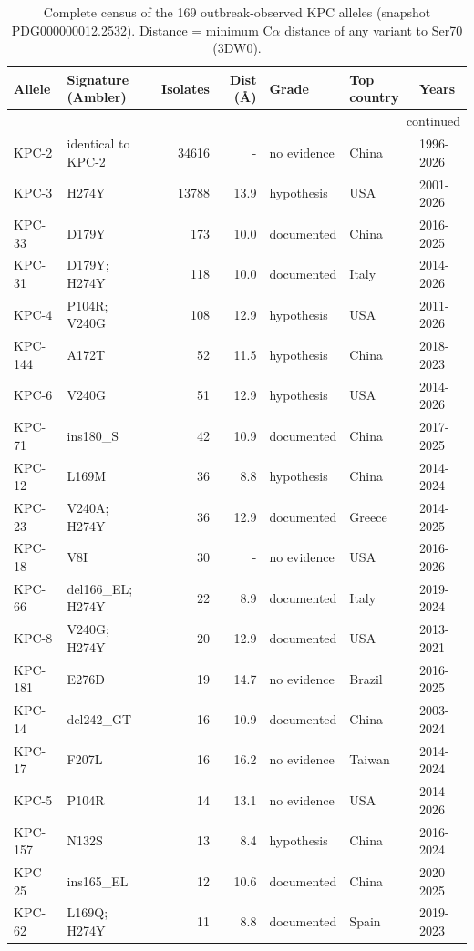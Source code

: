 \footnotesize\begin{longtable}{@{}l p{4.6cm} r r l l l@{}}
\caption{Complete census of the 169 outbreak-observed KPC alleles (snapshot PDG000000012.2532). Distance = minimum C$\alpha$ distance of any variant to Ser70 (3DW0).}\\
\hline Allele & Signature (Ambler) & Isolates & Dist (\AA) & Grade & Top country & Years \\\hline\endhead
\hline\multicolumn{7}{r}{continued}\\\endfoot
\hline\endlastfoot
KPC-2 & identical to KPC-2 & 34616 & - & no evidence & China & 1996-2026 \\
KPC-3 & H274Y & 13788 & 13.9 & hypothesis & USA & 2001-2026 \\
KPC-33 & D179Y & 173 & 10.0 & documented & China & 2016-2025 \\
KPC-31 & D179Y; H274Y & 118 & 10.0 & documented & Italy & 2014-2026 \\
KPC-4 & P104R; V240G & 108 & 12.9 & hypothesis & USA & 2011-2026 \\
KPC-144 & A172T & 52 & 11.5 & hypothesis & China & 2018-2023 \\
KPC-6 & V240G & 51 & 12.9 & hypothesis & USA & 2014-2026 \\
KPC-71 & ins180\_S & 42 & 10.9 & documented & China & 2017-2025 \\
KPC-12 & L169M & 36 & 8.8 & hypothesis & China & 2014-2024 \\
KPC-23 & V240A; H274Y & 36 & 12.9 & documented & Greece & 2014-2025 \\
KPC-18 & V8I & 30 & - & no evidence & USA & 2016-2026 \\
KPC-66 & del166\_EL; H274Y & 22 & 8.9 & documented & Italy & 2019-2024 \\
KPC-8 & V240G; H274Y & 20 & 12.9 & documented & USA & 2013-2021 \\
KPC-181 & E276D & 19 & 14.7 & no evidence & Brazil & 2016-2025 \\
KPC-14 & del242\_GT & 16 & 10.9 & documented & China & 2003-2024 \\
KPC-17 & F207L & 16 & 16.2 & no evidence & Taiwan & 2014-2024 \\
KPC-5 & P104R & 14 & 13.1 & no evidence & USA & 2014-2026 \\
KPC-157 & N132S & 13 & 8.4 & hypothesis & China & 2016-2024 \\
KPC-25 & ins165\_EL & 12 & 10.6 & documented & China & 2020-2025 \\
KPC-62 & L169Q; H274Y & 11 & 8.8 & documented & Spain & 2019-2023 \\

\end{longtable}
